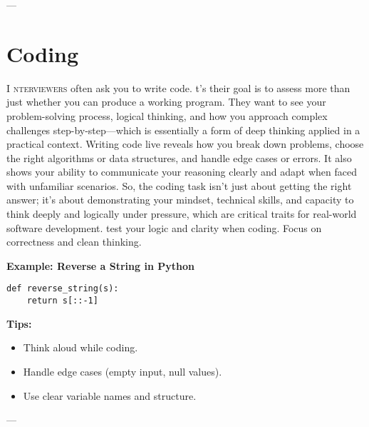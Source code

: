 \documentclass{book}
\begin{document}
---

\section{Coding}

\lettrine{I}{ nterviewers} often ask you to write code. t’s their goal is to assess more than just whether you
can produce a working program. They want to see your problem-solving process, logical thinking,
and how you approach complex challenges step-by-step—which is essentially a form of deep thinking
applied in a practical context. Writing code live reveals how you break down problems, choose the right
algorithms or data structures, and handle edge cases or errors. It also shows your ability to communicate
your reasoning clearly and adapt when faced with unfamiliar scenarios. So, the coding task isn’t just
about getting the right answer; it’s about demonstrating your mindset, technical skills, and capacity to
think deeply and logically under pressure, which are critical traits for real-world software development. 
test your logic and clarity when coding. Focus on correctness and clean thinking.

\vspace{0.4cm}
\noindent\textbf{Example: Reverse a String in Python}
\begin{verbatim}
def reverse_string(s):
    return s[::-1]
\end{verbatim}

\vspace{0.4cm}
\noindent\textbf{Tips:}
\begin{itemize}
  \item Think aloud while coding.
  \item Handle edge cases (empty input, null values).
  \item Use clear variable names and structure.
\end{itemize}

---
\end{document}
